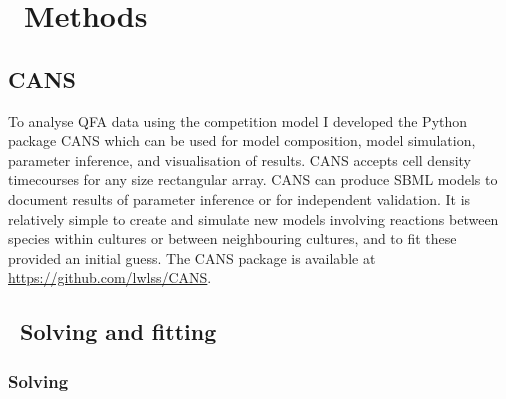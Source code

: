\graphicspath{{images/}}

\section{\thesection~Methods}
\label{sec:methods}

\subsection{CANS}

To analyse QFA data using the competition model I developed the Python
package CANS which can be used for model composition, model
simulation, parameter inference, and visualisation of results. CANS
accepts cell density timecourses for any size rectangular array. CANS
can produce SBML models to document results of parameter inference or
for independent validation. It is relatively simple to create and
simulate new models involving reactions between species within
cultures or between neighbouring cultures, and to fit these provided
an initial guess. The CANS package is available at
\href{https://github.com/lwlss/CANS}{https://github.com/lwlss/CANS}.

\subsection{\thesubsection~Solving and fitting}

\subsubsection{Solving}


